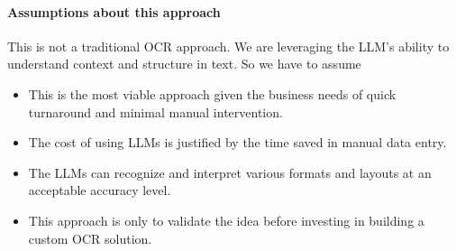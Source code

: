 \paragraph{Assumptions about this approach}
This is not a traditional OCR approach. We are leveraging the LLM's ability to understand context and structure in text. So we have to assume
\begin{itemize}
    \item This is the most viable approach given the business needs of quick turnaround and minimal manual intervention.
    \item The cost of using LLMs is justified by the time saved in manual data entry.
    \item The LLMs can recognize and interpret various formats and layouts at an acceptable accuracy level.
    \item This approach is only to validate the idea before investing in building a custom OCR solution.
\end{itemize}


